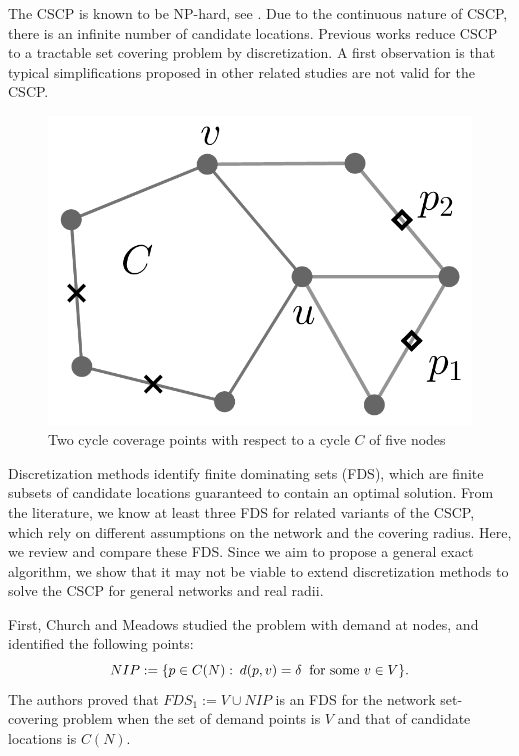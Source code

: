 The CSCP is known to be NP-hard, see \cite{Hartmann21}.  Due to the continuous nature of CSCP, there is an infinite number of candidate  locations. Previous works reduce CSCP to a tractable set covering problem by discretization. A first observation is that typical simplifications proposed in other related studies are not valid for the CSCP.




\begin{figure}
	\centering
	\includegraphics[scale=1.4]{Chaptercflg/media/cycle-cover-point.png}
	\caption{Two cycle coverage points with respect to a cycle $C$ of five nodes}
	\label{fig:cycle-cover}
\end{figure}
Discretization methods identify finite dominating sets (FDS), which are finite subsets of candidate locations guaranteed to contain an optimal solution. %
From the literature, we know at least three FDS for related variants of the CSCP, which rely on different assumptions on the network and the covering radius. Here, we review and compare these FDS. Since we aim to propose a general exact algorithm, we show that it may not be viable to extend discretization methods to solve the CSCP for general networks and real radii.

First, Church and Meadows \cite{Church79} studied the problem with demand at nodes, and identified the following points:
$$NIP:=\{p\in C(N):\: d(p,v)=\delta \:\textup{ for some }v\in V \}.$$
The authors proved that $FDS_1:=V\cup NIP$ is an FDS for the network set-covering problem when the set of demand points is $V$ and that of candidate locations is $C(N)$.

